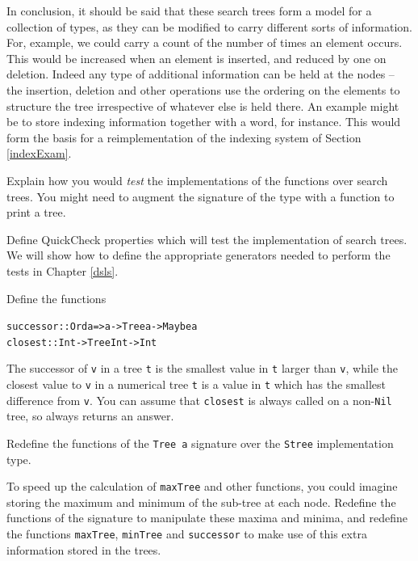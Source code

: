 In conclusion, it should be said that these search trees form a model for
a collection of types, as they can be modified to
carry different sorts of information. For, example, we could carry a count of
the number of times an element occurs. This would be increased when an element
is inserted, and reduced by one on deletion. Indeed any type of
additional information can be held at the nodes -- the insertion, deletion
and other operations use the ordering on the elements to structure the tree
irrespective of whatever else is held there. An example might be to store
indexing information together with a word, for instance. This would form the
basis for a reimplementation of the indexing system of Section
\ref{indexExam}.

\begin{exercises}

\item
Explain how you would {\em test\/} the implementations of the functions over
search trees. You might need to augment the signature of the type with a
function to print a tree.


\item
Define QuickCheck properties which will test the implementation of search trees. We will show how to define the appropriate generators needed to perform the tests in Chapter \ref{dsls}.




\item
 Define the functions
\begin{alltt}
successor :: Ord a => a -> Tree a -> Maybe a
closest   :: Int -> Tree Int -> Int 
\end{alltt}
The successor of \texttt{v} in a tree \texttt{t} is the smallest value in \texttt{t} larger
than \texttt{v}, while the closest value to \texttt{v} in a numerical tree \texttt{t}
is a value in \texttt{t} which has the smallest difference from \texttt{v}. 
You
can assume that \texttt{closest} is always called on a non-\texttt{Nil} tree, so
always returns an answer.

\item
Redefine the functions of the \texttt{Tree a} signature over the
\texttt{Stree} implementation type.

\item
To speed up the calculation of \texttt{maxTree} and other functions, you could
imagine storing the maximum and minimum of the sub-tree at each node.
Redefine the functions of the signature to manipulate these maxima and
minima, and redefine the functions \texttt{maxTree}, \texttt{minTree} and 
\texttt{successor} to make use of this extra information stored in the trees. 


\end{exercises}
